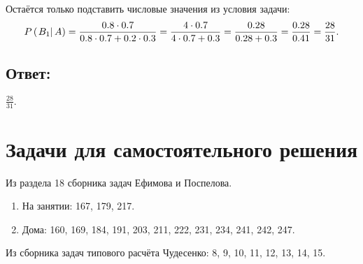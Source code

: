 Остаётся только подставить числовые значения из условия задачи:
\begin{equation}
    P \left ( \left . B_1 \right | A \right )
    = \frac{0.8 \cdot 0.7}{0.8 \cdot 0.7 + 0.2 \cdot 0.3}
    = \frac{4 \cdot 0.7}{4 \cdot 0.7 + 0.3}
    = \frac{0.28}{0.28 + 0.3}
    = \frac{0.28}{0.41}
    = \frac{28}{31} .
\end{equation}

\subsection*{Ответ:}
$\frac{28}{31} .$

\section*{Задачи для самостоятельного решения}

Из раздела 18 сборника задач Ефимова и Поспелова.
\begin{enumerate}
    \item На занятии: 167, 179, 217.
    \item Дома: 160, 169, 184, 191, 203, 211, 222, 231, 234, 241, 242, 247.
\end{enumerate}

Из сборника задач типового расчёта Чудесенко: 8, 9, 10, 11, 12, 13, 14, 15.